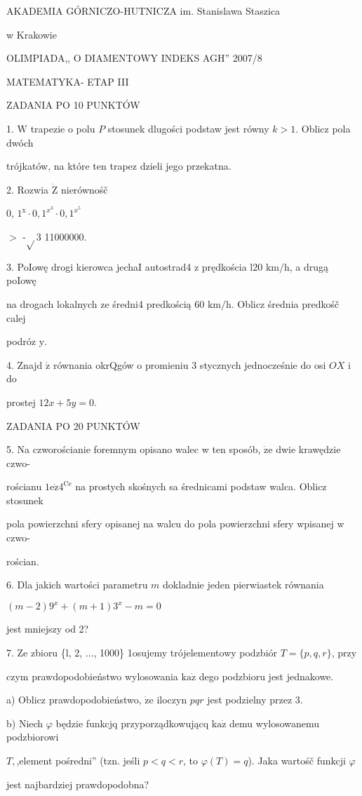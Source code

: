 \documentclass[a4paper,12pt]{article}
\begin{document}
AKADEMIA GÓRNICZO-HUTNICZA im. Stanislawa Staszica

w Krakowie

OLIMPIADA,, O DIAMENTOWY INDEKS AGH'' 2007/8

MATEMATYKA- ETAP III

ZADANIA PO 10 PUNKTÓW

1. $\mathrm{W}$ trapezie o polu $P$ stosunek dlugości podstaw jest równy $k>1$. Oblicz pola dwóch

trójkatów, na które ten trapez dzieli jego przekatna.

2. Rozwia $\dot{\mathrm{Z}}$ nierównośč

0, $1^{\mathrm{x}}\cdot 0, 1^{x^{3}}\cdot 0, 1^{x^{5}}$

$>$ -$\sqrt{}$3 11000000.

3. PoIowę drogi kierowca jechaI autostrad4 z prędkościa l20 $\mathrm{k}\mathrm{m}/\mathrm{h}$, a drugą poIowę

na drogach lokalnych ze średni4 predkością 60 $\mathrm{k}\mathrm{m}/\mathrm{h}$. Oblicz średnia predkośč calej

podróz $\mathrm{y}.$

4. Znajd $\acute{\mathrm{z}}$ równania okrQgów o promieniu 3 stycznych jednocześnie do osi $OX$ i do

prostej $12x+5y=0.$

ZADANIA PO 20 PUNKTÓW

5. Na czworościanie foremnym opisano walec w ten sposób, $\dot{\mathrm{z}}\mathrm{e}$ dwie krawędzie czwo-

rościanu $1\mathrm{e}\dot{\mathrm{z}}4^{\mathrm{C}\mathrm{e}}$ na prostych skośnych sa średnicami podstaw walca. Oblicz stosunek

pola powierzchni sfery opisanej na walcu do pola powierzchni sfery wpisanej w czwo-

rościan.

6. Dla jakich wartości parametru $m$ dokladnie jeden pierwiastek równania

$(m-2)9^{x}+(m+1)3^{x}-m=0$

jest mniejszy od 2?

7. Ze zbioru \{l, 2, $\ldots$, 1000\} 1osujemy trójelementowy podzbiór $T = \{p,q,r\}$, przy

czym prawdopodobieństwo wylosowania $\mathrm{k}\mathrm{a}\dot{\mathrm{z}}$ dego podzbioru jest jednakowe.

a) Oblicz prawdopodobieństwo, $\dot{\mathrm{z}}\mathrm{e}$ iloczyn $pqr$ jest podzielny przez 3.

b) Niech $\varphi$ będzie funkcjq przyporządkowującq $\mathrm{k}\mathrm{a}\dot{\mathrm{z}}$ demu wylosowanemu podzbiorowi

$T,$,element pośredni'' (tzn. jeśli $p<q<r$, to $\varphi(T)=q$). Jaka wartośč funkcji $\varphi$

jest najbardziej prawdopodobna?
\end{document}
